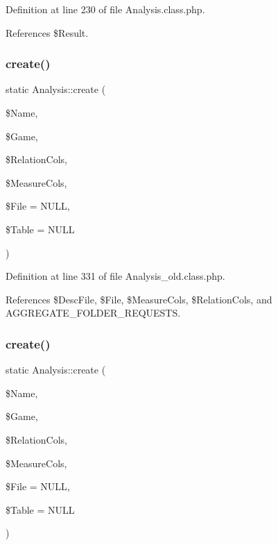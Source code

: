 Definition at line 230 of file Analysis.\+class.\+php.



References \$\+Result.

\mbox{\label{class_analysis_a866904091e0a8982224710f557dcfb52}} 
\subsubsection{\texorpdfstring{create()}{create()}\hspace{0.1cm}{\footnotesize\ttfamily [1/2]}}
{\footnotesize\ttfamily static Analysis\+::create (\begin{DoxyParamCaption}\item[{}]{\$\+Name,  }\item[{}]{\$\+Game,  }\item[{}]{\$\+Relation\+Cols,  }\item[{}]{\$\+Measure\+Cols,  }\item[{}]{\$\+File = {\ttfamily NULL},  }\item[{}]{\$\+Table = {\ttfamily NULL} }\end{DoxyParamCaption})\hspace{0.3cm}{\ttfamily [static]}}



Definition at line 331 of file Analysis\+\_\+old.\+class.\+php.



References \$\+Desc\+File, \$\+File, \$\+Measure\+Cols, \$\+Relation\+Cols, and A\+G\+G\+R\+E\+G\+A\+T\+E\+\_\+\+F\+O\+L\+D\+E\+R\+\_\+\+R\+E\+Q\+U\+E\+S\+TS.

\mbox{\label{class_analysis_a866904091e0a8982224710f557dcfb52}} 
\subsubsection{\texorpdfstring{create()}{create()}\hspace{0.1cm}{\footnotesize\ttfamily [2/2]}}
{\footnotesize\ttfamily static Analysis\+::create (\begin{DoxyParamCaption}\item[{}]{\$\+Name,  }\item[{}]{\$\+Game,  }\item[{}]{\$\+Relation\+Cols,  }\item[{}]{\$\+Measure\+Cols,  }\item[{}]{\$\+File = {\ttfamily NULL},  }\item[{}]{\$\+Table = {\ttfamily NULL} }\end{DoxyParamCaption})\hspace{0.3cm}{\ttfamily [static]}}


